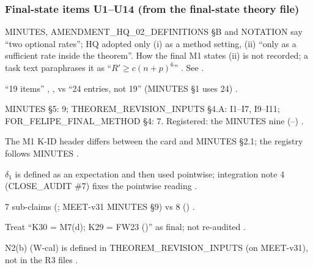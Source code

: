 \subsubsection*{Final-state items U1--U14 (from the final-state theory file)}
\begin{uncertain}
MINUTES, AMENDMENT\_HQ\_02\_DEFINITIONS §B and NOTATION say ``two optional rates''; HQ adopted only (i) as a method setting, (ii) ``only as a sufficient rate inside the theorem''. How the final M1 states (ii) is not recorded; a task text paraphrases it as ``$R'\ge c(n+p)^6$'' . See .
\end{uncertain}
\begin{uncertain}
``19 items'' , ,  vs ``24 entries, not 19''  (MINUTES §1 uses 24) .
\end{uncertain}
\begin{uncertain}
MINUTES §5: 9; THEOREM\_REVISION\_INPUTS §4.A: I1--I7, I9--I11; FOR\_FELIPE\_FINAL\_METHOD §4: 7. Registered: the MINUTES nine (--) .
\end{uncertain}
\begin{uncertain}[U4 · M1 K-ID header]
The M1 K-ID header differs between the card and MINUTES §2.1; the registry follows MINUTES .
\end{uncertain}
\begin{uncertain}[U5 · M5 $\delta_1$]
$\delta_1$ is defined as an expectation and then used pointwise; integration note 4 (CLOSE\_AUDIT \#7) fixes the pointwise reading .
\end{uncertain}
\begin{uncertain}
7 sub-claims (; MEET-v31 MINUTES §9) vs 8 () .
\end{uncertain}
\begin{uncertain}
Treat ``K30 = M7(d); K29 = FW23 ()'' as final;  not re-audited .
\end{uncertain}
\begin{uncertain}[U8 · label N2(b)]
N2(b) (W-cal) is defined in THEOREM\_REVISION\_INPUTS (on MEET-v31), not in the R3 files .
\end{uncertain}
